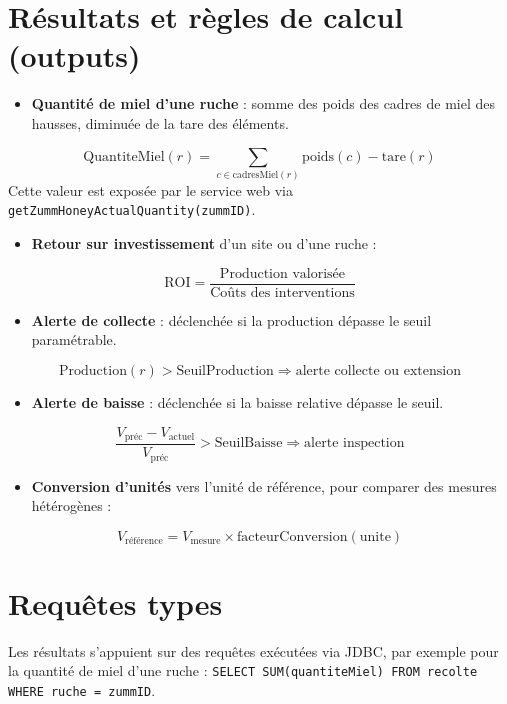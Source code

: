 \section{Résultats et règles de calcul (outputs)}
\begin{itemize}
  \item \textbf{Quantité de miel d'une ruche} : somme des poids des cadres de miel des hausses, diminuée de la tare des éléments.
\end{itemize}
\[ \text{QuantiteMiel}(r) = \sum_{c \in \text{cadresMiel}(r)} \text{poids}(c) - \text{tare}(r) \]
Cette valeur est exposée par le service web via \texttt{getZummHoneyActualQuantity(zummID)}.
\begin{itemize}
  \item \textbf{Retour sur investissement} d'un site ou d'une ruche :
\end{itemize}
\[ \text{ROI} = \frac{\text{Production valorisée}}{\text{Coûts des interventions}} \]
\begin{itemize}
  \item \textbf{Alerte de collecte} : déclenchée si la production dépasse le seuil paramétrable.
\end{itemize}
\[ \text{Production}(r) > \text{SeuilProduction} \Rightarrow \text{alerte collecte ou extension} \]
\begin{itemize}
  \item \textbf{Alerte de baisse} : déclenchée si la baisse relative dépasse le seuil.
\end{itemize}
\[ \frac{V_{\text{préc}} - V_{\text{actuel}}}{V_{\text{préc}}} > \text{SeuilBaisse} \Rightarrow \text{alerte inspection} \]
\begin{itemize}
  \item \textbf{Conversion d'unités} vers l'unité de référence, pour comparer des mesures hétérogènes :
\end{itemize}
\[ V_{\text{référence}} = V_{\text{mesure}} \times \text{facteurConversion}(\text{unite}) \]

\section{Requêtes types}
Les résultats s'appuient sur des requêtes exécutées via JDBC, par exemple pour la
quantité de miel d'une ruche : \texttt{SELECT SUM(quantiteMiel) FROM recolte WHERE ruche = zummID}.

